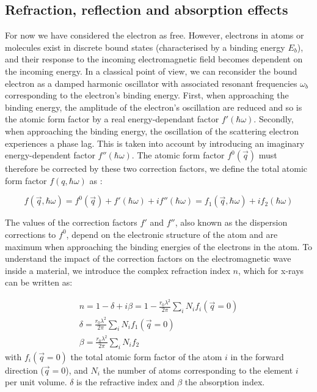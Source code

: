\subsection{Refraction, reflection and absorption effects}\label{sec:RefractionReflectionAbsorption}

For now we have considered the electron as free.
However, electrons in atoms or molecules exist in discrete bound states (characterised by a binding energy $E_b$), and their response to the incoming electromagnetic field becomes dependent on the incoming energy.
In a classical point of view, we can reconsider the bound electron as a damped harmonic oscillator with associated resonant frequencies $\omega_b$ corresponding to the electron's binding energy.
First, when approaching the binding energy, the amplitude of the electron's oscillation are reduced and so is the atomic form factor by a real energy-dependant factor $f'(\hbar\omega)$.
Secondly, when approaching the binding energy, the oscillation of the scattering electron experiences a phase lag.
This is taken into account by introducing an imaginary energy-dependent factor $f''(\hbar\omega)$.
The atomic form factor $f^0(\vec{q})$ must therefore be corrected by these two correction factors, we define the total atomic form factor $f(q, \hbar\omega)$ as \parencite{NielsenMcMorrow}:

\begin{equation}
    f(\vec{q}, \hbar\omega) = f^0(\vec{q}) + f'(\hbar\omega) + if''(\hbar\omega) = f_1(\vec{q}, \hbar\omega) + i f_2(\hbar\omega)
\end{equation}

The values of the correction factors $f'$ and $f''$, also known as the dispersion corrections to $f^0$, depend on the electronic structure of the atom and are maximum when approaching the binding energies of the electrons in the atom.
To understand the impact of the correction factors on the electromagnetic wave inside a material, we introduce the complex refraction index $n$, which for x-rays can be written as:

\begin{gather}
    n = 1-\delta+i\beta = 1 - \frac{r_0 \lambda^2}{2\pi} \sum_i N_i f_i(\vec{q}=0)\\
    \label{eq:delta}
    \delta = \frac{r_0 \lambda^2}{2\pi} \sum_i N_i f_1(\vec{q}=0)\\
    \beta = \frac{r_0 \lambda^2}{2\pi} \sum_i N_i f_2
\end{gather}
with $f_i(\vec{q}=0)$ the total atomic form factor of the atom $i$ in the forward direction ($\vec{q}=0$), and $N_i$ the number of atoms corresponding to the element $i$ per unit volume.
$\delta$ is the refractive index and $\beta$ the absorption index.

